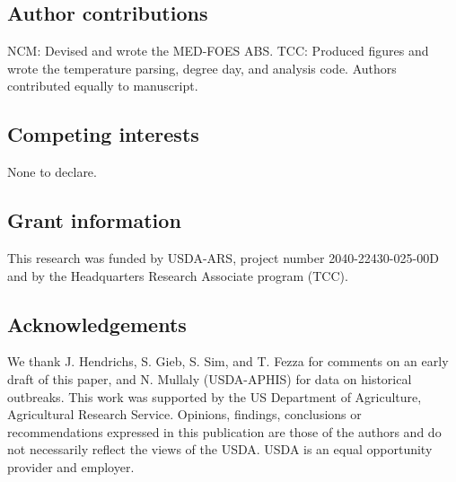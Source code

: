 \documentclass[10pt,a4paper,twocolumn]{article}
\begin{document}




\subsection*{Author contributions}
NCM: Devised and wrote the MED-FOES ABS.
TCC: Produced figures and wrote the temperature parsing, degree day, and analysis code.
Authors contributed equally to manuscript.

\subsection*{Competing interests}
None to declare.

\subsection*{Grant information}
This research was funded by USDA-ARS, project number 2040-22430-025-00D and by the Headquarters 
Research Associate program (TCC).

\subsection*{Acknowledgements}
We thank J. Hendrichs, S. Gieb, S. Sim, and T. Fezza 
for comments on an early draft of this paper, 
and N. Mullaly (USDA-APHIS) for data on historical outbreaks. 
This work was supported by the US Department of Agriculture, Agricultural Research Service. Opinions, findings, conclusions or recommendations expressed in this publication are those of the authors and do not necessarily reflect the views of the USDA. USDA is an equal opportunity provider and employer.

{\small
}

\end{document}
